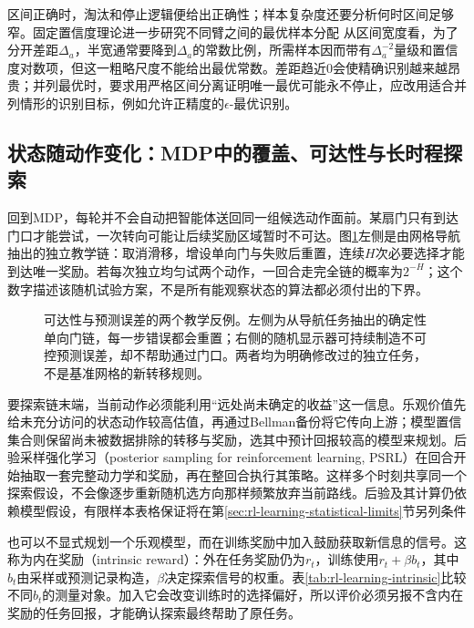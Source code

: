 区间正确时，淘汰和停止逻辑便给出正确性；样本复杂度还要分析何时区间足够窄。固定置信度理论进一步研究不同臂之间的最优样本分配
从区间宽度看，为了分开差距$\Delta_a$，半宽通常要降到$\Delta_a$的常数比例，所需样本因而带有$\Delta_a^{-2}$量级和置信度对数项，但这一粗略尺度不能给出最优常数。差距趋近0会使精确识别越来越昂贵；并列最优时，要求用严格区间分离证明唯一最优可能永不停止，应改用适合并列情形的识别目标，例如允许正精度的$\epsilon$-最优识别。

\subsection{状态随动作变化：MDP中的覆盖、可达性与长时程探索}
\label{sec:rl-learning-deep-exploration}

回到MDP，每轮并不会自动把智能体送回同一组候选动作面前。某扇门只有到达门口才能尝试，一次转向可能让后续奖励区域暂时不可达。图\ref{fig:rl-learning-exploration-chain}左侧是由网格导航抽出的独立教学链：取消滑移，增设单向门与失败后重置，连续$H$次必要选择才能到达唯一奖励。若每次独立均匀试两个动作，一回合走完全链的概率为$2^{-H}$；这个数字描述该随机试验方案，不是所有能观察状态的算法都必须付出的下界。

\begin{figure}[t]
  \centering
  
  \caption{可达性与预测误差的两个教学反例。左侧为从导航任务抽出的确定性单向门链，每一步错误都会重置；右侧的随机显示器可持续制造不可控预测误差，却不帮助通过门口。两者均为明确修改过的独立任务，不是基准网格的新转移规则。}
  \label{fig:rl-learning-exploration-chain}
\end{figure}

要探索链末端，当前动作必须能利用“远处尚未确定的收益”这一信息。乐观价值先给未充分访问的状态动作较高估值，再通过Bellman备份将它传向上游；模型置信集合则保留尚未被数据排除的转移与奖励，选其中预计回报较高的模型来规划。后验采样强化学习（posterior sampling for reinforcement learning, PSRL）在回合开始抽取一套完整动力学和奖励，再在整回合执行其策略。这样多个时刻共享同一个探索假设，不会像逐步重新随机选方向那样频繁放弃当前路线。后验及其计算仍依赖模型假设，有限样本表格保证将在第\ref{sec:rl-learning-statistical-limits}节另列条件

也可以不显式规划一个乐观模型，而在训练奖励中加入鼓励获取新信息的信号。这称为内在奖励（intrinsic reward）：外在任务奖励仍为$r_t$，训练使用$r_t+\beta b_t$，其中$b_t$由采样或预测记录构造，$\beta$决定探索信号的权重。表\ref{tab:rl-learning-intrinsic}比较不同$b_t$的测量对象。加入它会改变训练时的选择偏好，所以评价必须另报不含内在奖励的任务回报，才能确认探索最终帮助了原任务。

